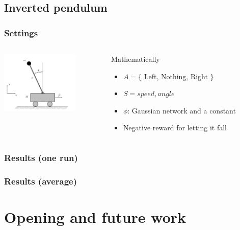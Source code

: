 \documentclass{beamer}
\begin{document}
\subsection{Inverted pendulum}
\label{sec-4_4}
\begin{frame}
\frametitle{Settings}
\label{sec-4_4_1}
\begin{columns}
\begin{column}{0.4\textwidth}
\label{sec-4_4_1_1}

     \includegraphics[width=10em]{InvertedPendulum.png}
\end{column}
\begin{column}{0.55\textwidth}
\begin{block}{Mathematically}
\label{sec-4_4_1_2}


\begin{itemize}
\item $A = \{$ Left, Nothing, Right $\}$
\item $S = {speed,angle}$
\item $\phi$: Gaussian network and a constant
\item Negative reward for letting it fall
\end{itemize}
\end{block}
\end{column}
\end{columns}
\end{frame}
\begin{frame}
\frametitle{Results (one run)}
\label{sec-4_4_2}

\center
\resizebox{.9\columnwidth}{!}{}
\end{frame}
\begin{frame}
\frametitle{Results (average)}
\label{sec-4_4_3}

\center
\resizebox{.9\columnwidth}{!}{}
\end{frame}
\section{Opening and future work}
\label{sec-5}
\end{document}
